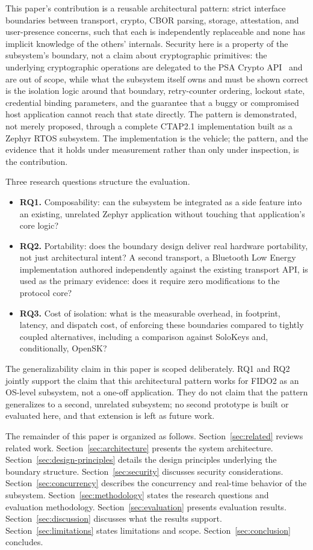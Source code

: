 This paper's contribution is a reusable architectural pattern: strict interface boundaries between transport, crypto, CBOR parsing, storage, attestation, and user-presence concerns, such that each is independently replaceable and none has implicit knowledge of the others' internals. Security here is a property of the subsystem's boundary, not a claim about cryptographic primitives: the underlying cryptographic operations are delegated to the PSA Crypto API~\cite{psa-crypto-api} and are out of scope, while what the subsystem itself owns and must be shown correct is the isolation logic around that boundary, retry-counter ordering, lockout state, credential binding parameters, and the guarantee that a buggy or compromised host application cannot reach that state directly. The pattern is demonstrated, not merely proposed, through a complete CTAP2.1 implementation built as a Zephyr RTOS subsystem. The implementation is the vehicle; the pattern, and the evidence that it holds under measurement rather than only under inspection, is the contribution.

Three research questions structure the evaluation.

\begin{itemize}
\item \textbf{RQ1.} Composability: can the subsystem be integrated as a side feature into an existing, unrelated Zephyr application without touching that application's core logic?
\item \textbf{RQ2.} Portability: does the boundary design deliver real hardware portability, not just architectural intent? A second transport, a Bluetooth Low Energy implementation authored independently against the existing transport API, is used as the primary evidence: does it require zero modifications to the protocol core?
\item \textbf{RQ3.} Cost of isolation: what is the measurable overhead, in footprint, latency, and dispatch cost, of enforcing these boundaries compared to tightly coupled alternatives, including a comparison against SoloKeys and, conditionally, OpenSK?
\end{itemize}

The generalizability claim in this paper is scoped deliberately. RQ1 and RQ2 jointly support the claim that this architectural pattern works for FIDO2 as an OS-level subsystem, not a one-off application. They do not claim that the pattern generalizes to a second, unrelated subsystem; no second prototype is built or evaluated here, and that extension is left as future work.

The remainder of this paper is organized as follows. Section~\ref{sec:related} reviews related work. Section~\ref{sec:architecture} presents the system architecture. Section~\ref{sec:design-principles} details the design principles underlying the boundary structure. Section~\ref{sec:security} discusses security considerations. Section~\ref{sec:concurrency} describes the concurrency and real-time behavior of the subsystem. Section~\ref{sec:methodology} states the research questions and evaluation methodology. Section~\ref{sec:evaluation} presents evaluation results. Section~\ref{sec:discussion} discusses what the results support. Section~\ref{sec:limitations} states limitations and scope. Section~\ref{sec:conclusion} concludes.